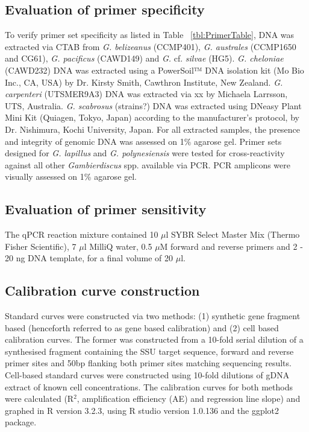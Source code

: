 \documentclass[12pt]{article}
\begin{document}
\subsection{Evaluation of primer specificity}
To verify primer set specificity as listed in Table ~\ref{tbl:PrimerTable}, DNA was extracted via CTAB from \emph{G. belizeanus} (CCMP401), \emph{G. australes} (CCMP1650 and CG61), \emph{G. pacificus} (CAWD149) and \emph{G.} cf. \emph{silvae} (HG5). \emph{G. cheloniae} (CAWD232) DNA was extracted using a PowerSoil™ DNA isolation kit (Mo Bio Inc., CA, USA) by Dr. Kirsty Smith, Cawthron Institute, New Zealand. \emph{G. carpenteri} (UTSMER9A3) DNA was extracted via xx by Michaela Larrsson, UTS, Australia. \emph{G. scabrosus} (strains?) DNA was extracted using DNeasy Plant Mini Kit (Quiagen, Tokyo, Japan) according to the manufacturer's protocol, by Dr. Nishimura, Kochi University, Japan. For all extracted samples, the presence and integrity of genomic DNA was assessed on 1\% agarose gel. Primer sets designed for \emph{G. lapillus} and \emph{G. polynesiensis} were tested for cross-reactivity against all other \emph{Gambierdiscus} spp. available via PCR. PCR amplicons were visually assessed on 1\% agarose gel.


\subsection{Evaluation of primer sensitivity}
The qPCR reaction mixture contained 10 $\mu$l SYBR Select Master Mix (Thermo Fisher Scientific), 7 $\mu$l MilliQ water, 0.5 $\mu$M forward and reverse primers and 2 - 20 ng DNA template, for a final volume of 20 $\mu$l.
\subsection{Calibration curve construction}
Standard curves were constructed via two methods: (1) synthetic gene fragment based (henceforth referred to as gene based calibration) and (2) cell based calibration curves. The former was constructed from a 10-fold serial dilution of a synthesised fragment containing the SSU target sequence, forward and reverse primer sites and 50bp flanking both primer sites matching sequencing results. Cell-based standard curves were constructed using 10-fold dilutions of gDNA extract of known cell concentrations.
The calibration curves for both methods were calculated (R$^{2}$, amplification efficiency (AE) and regression line slope) and graphed in R version 3.2.3, using R studio version 1.0.136 and the ggplot2 package. 
\end{document}
